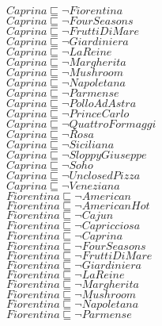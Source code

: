 \documentclass[a4paper,10pt]{article}
\begin{document}
 $Caprina \sqsubseteq  \lnot Fiorentina$\\ 
 $Caprina \sqsubseteq  \lnot FourSeasons$\\ 
 $Caprina \sqsubseteq  \lnot FruttiDiMare$\\ 
 $Caprina \sqsubseteq  \lnot Giardiniera$\\ 
 $Caprina \sqsubseteq  \lnot LaReine$\\ 
 $Caprina \sqsubseteq  \lnot Margherita$\\ 
 $Caprina \sqsubseteq  \lnot Mushroom$\\ 
 $Caprina \sqsubseteq  \lnot Napoletana$\\ 
 $Caprina \sqsubseteq  \lnot Parmense$\\ 
 $Caprina \sqsubseteq  \lnot PolloAdAstra$\\ 
 $Caprina \sqsubseteq  \lnot PrinceCarlo$\\ 
 $Caprina \sqsubseteq  \lnot QuattroFormaggi$\\ 
 $Caprina \sqsubseteq  \lnot Rosa$\\ 
 $Caprina \sqsubseteq  \lnot Siciliana$\\ 
 $Caprina \sqsubseteq  \lnot SloppyGiuseppe$\\ 
 $Caprina \sqsubseteq  \lnot Soho$\\ 
 $Caprina \sqsubseteq  \lnot UnclosedPizza$\\ 
 $Caprina \sqsubseteq  \lnot Veneziana$\\ 
 $Fiorentina \sqsubseteq  \lnot American$\\ 
 $Fiorentina \sqsubseteq  \lnot AmericanHot$\\ 
 $Fiorentina \sqsubseteq  \lnot Cajun$\\ 
 $Fiorentina \sqsubseteq  \lnot Capricciosa$\\ 
 $Fiorentina \sqsubseteq  \lnot Caprina$\\ 
 $Fiorentina \sqsubseteq  \lnot FourSeasons$\\ 
 $Fiorentina \sqsubseteq  \lnot FruttiDiMare$\\ 
 $Fiorentina \sqsubseteq  \lnot Giardiniera$\\ 
 $Fiorentina \sqsubseteq  \lnot LaReine$\\ 
 $Fiorentina \sqsubseteq  \lnot Margherita$\\ 
 $Fiorentina \sqsubseteq  \lnot Mushroom$\\ 
 $Fiorentina \sqsubseteq  \lnot Napoletana$\\ 
 $Fiorentina \sqsubseteq  \lnot Parmense$\\ 
\end{document}
